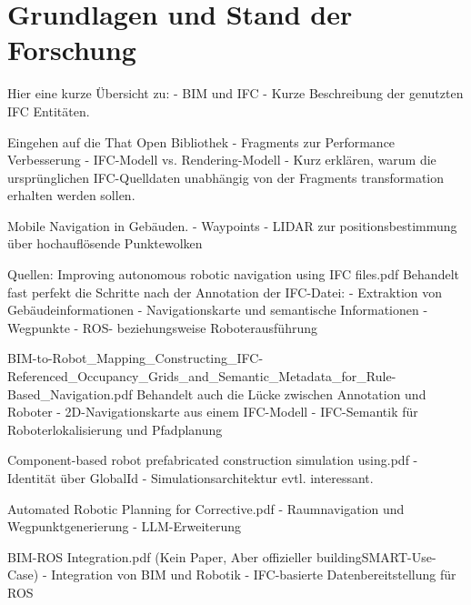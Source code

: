 \section{Grundlagen und Stand der Forschung}\label{sec:Grundlagen}
Hier eine kurze Übersicht zu:
- BIM und IFC \newline
- Kurze Beschreibung der genutzten IFC Entitäten. \newline

Eingehen auf die That Open Bibliothek \newline
- Fragments zur Performance Verbesserung \newline
- IFC-Modell vs. Rendering-Modell \newline
- Kurz erklären, warum die ursprünglichen IFC-Quelldaten unabhängig von der Fragments transformation erhalten werden sollen. \newline


Mobile Navigation in Gebäuden. \newline
- Waypoints \newline
- LIDAR zur positionsbestimmung über hochauflösende Punktewolken \newline

Quellen: \newline
Improving autonomous robotic navigation using IFC files.pdf \newline
Behandelt fast perfekt die Schritte nach der Annotation der IFC-Datei: \newline
- Extraktion von Gebäudeinformationen \newline
- Navigationskarte und semantische Informationen \newline
- Wegpunkte \newline
- ROS- beziehungsweise Roboterausführung \newline


BIM-to-Robot\_Mapping\_Constructing\_IFC-Referenced\_Occupancy\_Grids\_and\_Semantic\_Metadata\_for\_Rule-Based\_Navigation.pdf \newline
Behandelt auch die Lücke zwischen Annotation und Roboter \newline
- 2D-Navigationskarte aus einem IFC-Modell \newline
- IFC-Semantik für Roboterlokalisierung und Pfadplanung \newline

Component-based robot prefabricated construction simulation using.pdf \newline
- Identität über GlobalId \newline
- Simulationsarchitektur evtl. interessant. \newline

Automated Robotic Planning for Corrective.pdf \newline
- Raumnavigation und Wegpunktgenerierung \newline
- LLM-Erweiterung \newline

BIM-ROS Integration.pdf (Kein Paper, Aber offizieller buildingSMART-Use-Case) \newline
- Integration von BIM und Robotik \newline
- IFC-basierte Datenbereitstellung für ROS \newline

